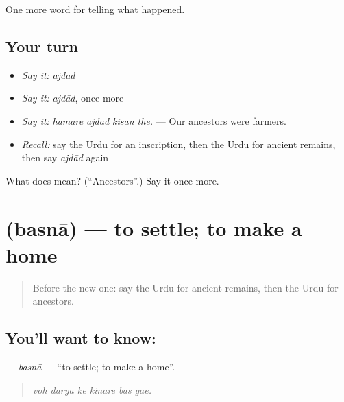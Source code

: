 \begin{grammarlens}[title={What you've built}]
One more word for telling what happened.
\end{grammarlens}

\subsection*{Your turn}
\begin{itemize}
\raggedright
  \item \emph{Say it:} \emph{ajdād}
  \item \emph{Say it:} \emph{ajdād}, once more
  \item \emph{Say it:} \emph{hamāre ajdād kisān the.} — Our ancestors were farmers.
  \item \emph{Recall:} say the Urdu for an inscription, then the Urdu for ancient remains, then say \emph{ajdād} again
\end{itemize}

\begin{tcolorbox}[breakable,colback=teal!4,colframe=teal!35!black,title={Before you move on}]
What does  mean? (\textquotedblleft{}Ancestors\textquotedblright{}.) Say it once more.
\end{tcolorbox}
\section[\texorpdfstring{\ur{بسنا} (basnā)}{بسنا (basnā)}]{ (basnā) — to settle; to make a home}

\label{lesson:UR-C315-basna}



\begin{quote}
Before the new one: say the Urdu for ancient remains, then the Urdu for ancestors.
\end{quote}

\subsection*{You'll want to know: }
\textbf{} — \emph{basnā} — \textquotedblleft{}to settle; to make a home\textquotedblright{}.

\begin{quote}
     
\end{quote}

\begin{quote}
\emph{voh daryā ke kināre bas gae.}
\end{quote}

